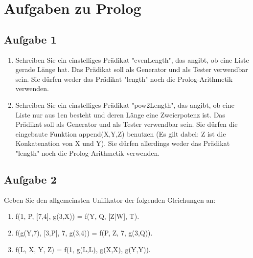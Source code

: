 \documentclass{scrartcl}
\begin{document}
\section*{Aufgaben zu Prolog}
\subsection*{Aufgabe 1}
\begin{enumerate}[1.]
\item Schreiben Sie ein einstelliges Prädikat "evenLength", das angibt, ob eine Liste gerade Länge hat. Das Prädikat soll als Generator und als Tester verwendbar sein. Sie dürfen weder das Prädikat "length" noch die Prolog-Arithmetik verwenden. 
\item Schreiben Sie ein einstelliges Prädikat "pow2Length", das angibt, ob eine Liste nur aus 1en besteht und deren Länge eine Zweierpotenz ist. Das Prädikat soll als Generator und als Tester verwendbar sein. Sie dürfen die eingebaute Funktion append(X,Y,Z) benutzen (Es gilt dabei: Z ist die Konkatenation von X und Y). Sie dürfen allerdings weder das Prädikat "length" noch die Prolog-Arithmetik verwenden. 
\end{enumerate}

\subsection*{Aufgabe 2}
Geben Sie den allgemeinsten Unifikator der folgenden Gleichungen an:
\begin{enumerate}[1.]
\item f(1, P, [7,4], g(3,X)) = f(Y, Q, [Z|W], T).
\item f(g(Y,7), [3,P], 7, g(3,4)) = f(P, Z, 7, g(3,Q)).
\item f(L, X, Y, Z) = f(1, g(L,L), g(X,X), g(Y,Y)).
\end{enumerate}
\end{document}
